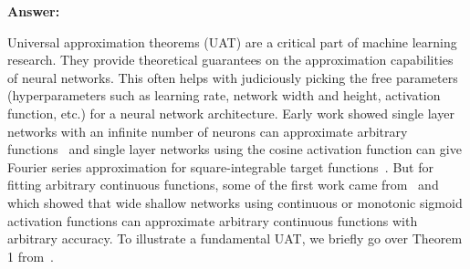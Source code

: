 {\bf Answer:}

Universal approximation theorems (UAT) are a critical part of machine learning research. They provide theoretical guarantees on the approximation capabilities of neural networks. This often helps with judiciously picking the free parameters (hyperparameters such as learning rate, network width and height, activation function, etc.) for a neural network architecture. Early work showed single layer networks with an infinite number of neurons can approximate arbitrary functions~\citep{irie1988capabilities} and single layer networks using the cosine activation function can give Fourier series approximation for square-integrable target functions~\citep{gallant1988there}. But for fitting arbitrary continuous functions, some of the first work came from~\citep{cybenko1989approximation} and~\citep{hornik1989multilayer} which showed that wide shallow networks using continuous or monotonic sigmoid activation functions can approximate arbitrary continuous functions with arbitrary accuracy. To illustrate a fundamental UAT, we briefly go over Theorem 1 from~\citep{cybenko1989approximation}.
